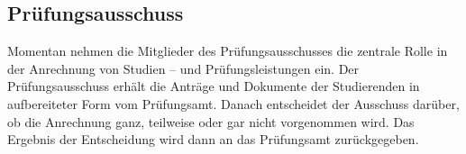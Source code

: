 \subsection{Prüfungsausschuss}

Momentan nehmen die Mitglieder des Prüfungsausschusses die zentrale Rolle in der Anrechnung von Studien – und Prüfungsleistungen ein. Der Prüfungsausschuss erhält die Anträge und Dokumente der Studierenden in aufbereiteter Form vom Prüfungsamt. Danach entscheidet der Ausschuss darüber, ob die Anrechnung ganz, teilweise oder gar nicht vorgenommen wird. Das Ergebnis der Entscheidung wird dann an das Prüfungsamt zurückgegeben.
